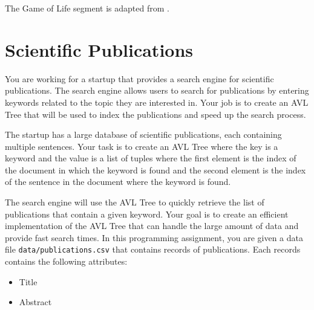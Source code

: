 \documentclass[addpoints]{exam}
\begin{document}
The Game of Life segment is adapted from \cite{gol_impl}.

\newpage
\part{Scientific Publications}

You are working for a startup that provides a search engine for scientific publications. The search engine allows users to search for publications by 
entering keywords related to the topic they are interested in. Your job is to create an AVL Tree that will be used to index the publications and speed up the search process.

The startup has a large database of scientific publications, each containing multiple sentences. Your task is to create an AVL Tree 
where the key is a keyword and the value is a list of tuples where the first element is the index of the document in which the 
keyword is found and the second element is the index of the sentence in the document where the keyword is found.

The search engine will use the AVL Tree to quickly retrieve the list of publications that contain a given keyword. Your goal is to create an efficient implementation of the AVL Tree that can handle the large amount of data and provide fast search times.
In this programming assignment, you are given a data file \texttt{data/publications.csv} that contains records of publications. Each records contains the following attributes:
\begin{itemize}
  \item Title
  \item Abstract
\end{itemize}
\end{document}
